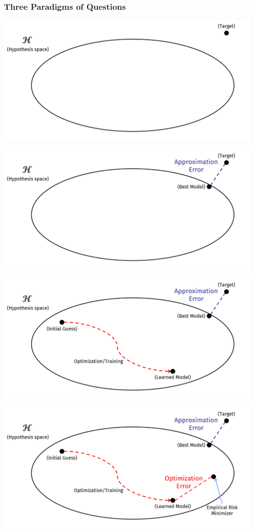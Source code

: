 \begin{frame}
    \frametitle{Three Paradigms of Questions}

    \begin{overprint}
        \centerline{\includegraphics[width=\textwidth]{Figures/paradigm_1.png}}
        \centerline{\includegraphics[width=\textwidth]{Figures/paradigm_2.png}}
        \centerline{\includegraphics[width=\textwidth]{Figures/paradigm_3.png}}
        \centerline{\includegraphics[width=\textwidth]{Figures/paradigm_4.png}}

\end{overprint}
\end{frame}
